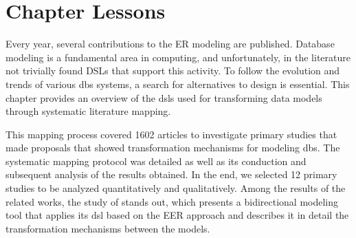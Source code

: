 \section{Chapter Lessons} \label{sec_slm:lessons}

Every year, several contributions to the ER modeling are published.
Database modeling is a fundamental area in computing, and unfortunately, in the literature not trivially found DSLs that support this activity.
To follow the evolution and trends of various \acp{db} systems, a search for alternatives to design is essential.
This chapter provides an overview of the \acp{dsl} used for transforming data models through systematic literature mapping.

This mapping process covered 1602 articles to investigate primary studies that made proposals that showed transformation mechanisms for modeling \acp{db}.
The systematic mapping protocol was detailed as well as its conduction and subsequent analysis of the results obtained.
In the end, we selected 12 primary studies to be analyzed quantitatively and qualitatively.
Among the results of the related works, the study of  stands out, which presents a bidirectional modeling tool that applies its \ac{dsl} based on the EER approach and describes it in detail the transformation mechanisms between the models.

